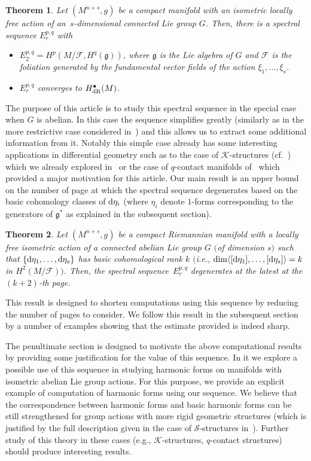 \documentclass[pdftex]{sigma}
\numberwithin{equation}{section}
\newtheorem{tw}{Theorem}[section]
\theoremstyle{definition}
\begin{document}
\begin{tw}\label{RecG} Let $(M^{n+s},g)$ be a compact manifold with an isometric locally free action of an~$s$-dimensional connected Lie group $G$. Then, there is a spectral sequence $E^{p,q}_r$ with
\begin{itemize}\itemsep=0pt
\item $E^{p,q}_2=H^p(M\slash\mathcal{F}, H^{q}(\mathfrak{g}))$, where $\mathfrak{g}$ is the Lie algebra of $G$ and $\mathcal{F}$ is the foliation generated by the fundamental vector fields of the action $\xi_1,\dots,\xi_s$.
\item $E^{p,q}_r$ converges to $H^{\bullet}_{\rm dR}(M)$.
\end{itemize}
\end{tw}
The purpose of this article is to study this spectral sequence in the special case when $G$ is abelian. In this case the sequence simplifies greatly (similarly as in the more restrictive case considered in~\cite{My3}) and this allows us to extract some additional information from it. Notably this simple case already has some interesting applications in differential geometry such as to the case of $\mathcal{K}$-structures (cf.\ \cite{B}) which we already explored in~\cite{My3} or the case of $q$-contact manifolds of~\cite{F} which provided a major motivation for this article. Our main result is an upper bound on the number of page at which the spectral sequence degenerates based on the basic cohomology classes of ${\rm d}\eta_i$ (where $\eta_i$ denote $1$-forms corresponding to the generators of $\mathfrak{g}^*$ as explained in the subsequent section).

\begin{tw}\label{Main} Let $(M^{n+s},g)$ be a compact Riemannian manifold with a locally free isometric action of a connected abelian Lie group $G$ $($of dimension $s)$ such that $\{{\rm d}\eta_1,\dots,{\rm d}\eta_s\}$ has basic cohomological rank $k$ $\bigl($i.e., $\dim \langle [{\rm d}\eta_1], \dots, [{\rm d}\eta_s] \rangle = k$ in $H^2(M\slash\mathcal{F})\bigr)$. Then, the spectral sequence~$E^{p,q}_r$ degenerates at the latest at the $(k+2)$-th page.
\end{tw}
 This result is designed to shorten computations using this sequence by reducing the number of pages to consider. We follow this result in the subsequent section by a number of examples showing that the estimate provided is indeed sharp.

 The penultimate section is designed to motivate the above computational results by providing some justification for the value of this sequence. In it we explore a possible use of this sequence in studying harmonic forms on manifolds with isometric abelian Lie group actions. For this purpose, we provide an explicit example of computation of harmonic forms using our sequence. We believe that the correspondence between harmonic forms and basic harmonic forms can be still strengthened for group actions with more rigid geometric structures (which is justified by the full description given in the case of $\mathcal{S}$-structures in~\cite{My3}). Further study of this theory in these cases (e.g., $\mathcal{K}$-structures, $q$-contact structures) should produce interesting results.
\end{document}
